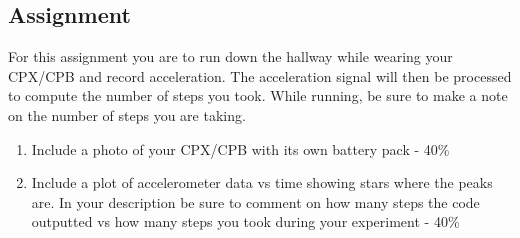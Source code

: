 \subsection{Assignment}

For this assignment you are to run down the hallway while wearing your CPX/CPB and record acceleration. The acceleration signal will then be processed to compute the number of steps you took. While running, be sure to make a note on the number of steps you are taking. 



\begin{enumerate}[itemsep=-5pt]
\item Include a photo of your CPX/CPB with its own battery pack - 40\%
\item Include a plot of accelerometer data vs time showing stars where the peaks are. In your description be sure to comment on how many steps the code outputted vs how many steps you took during your experiment - 40\%
\end{enumerate}
